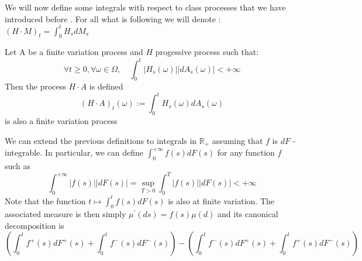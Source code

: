 	We will now define some integrals with respect to class processes that we have introduced before . For all what is following we will denote :$(H \cdot M)_{t}=\int_{0}^{t} H_{s} d M_{s}$

	\begin{definition}
		Let A be a finite variation process and $H$ progessive process such that:
		$$
		\forall t \geq 0, \forall \omega \in \Omega, \quad \int_{0}^{t}\left|H_{s}(\omega)\right|\left|d A_{s}(\omega)\right|<+\infty
		$$
		Then the process $H \cdot A$ is defined
		$$
		(H \cdot A)_{t}(\omega):=\int_{0}^{t} H_{s}(\omega) d A_{s}(\omega)
		$$
		is also a finite variation process
	\end{definition}

	We can extend the previous definitions to integrals in $\mathbb{R}_{+}$ assuming that $ f  $ is $ d F $ -integrable. In particular, we can define $ \int_ {0} ^{+\infty} f(s) dF(s)$ for any function $ f $ such as
	 \[ \int_{0}^{+\infty}|f (s)||dF(s)| = \sup_{T> 0}\int_ {0}^{T} |f(s)||dF(s)|<+\infty \]
	Note that the function $t\mapsto \int_{0}^{t}f(s)dF(s)$ is also at finite variation. The associated measure is then simply $\mu^{\prime}(d s)=f(s)\mu(d)$ and its canonical decomposition is
	$$
	\left(\int_{0}^{t} f^{+}(s) d F^{+}(s)+\int_{0}^{t} f^{-}(s) d F^{-}(s)\right)-\left(\int_{0}^{t} f^{-}(s) d F^{+}(s)+\int_{0}^{t} f^{+}(s) d F^{-}(s)\right)
	$$

